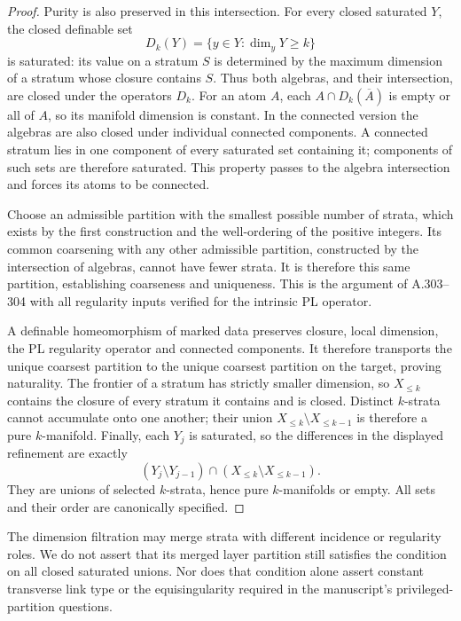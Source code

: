 \begin{proof}
Purity is also preserved in this intersection. For every closed
saturated $Y$, the closed definable set
\[
 D_k(Y)=\{y\in Y:\dim_yY\ge k\}
\]
is saturated: its value on a stratum $S$ is determined by the
maximum dimension of a stratum whose closure contains $S$.
Thus both algebras, and their intersection, are closed under the
operators $D_k$. For an atom $A$, each $A\cap D_k(\overline A)$
is empty or all of $A$, so its manifold dimension is constant.
In the connected version the algebras are also closed under
individual connected components. A connected stratum lies in one
component of every saturated set containing it; components of such
sets are therefore saturated. This property passes to the algebra
intersection and forces its atoms to be connected.

Choose an admissible partition with the smallest possible number
of strata, which exists by the first construction and the
well-ordering of the positive integers. Its common coarsening with
any other admissible partition, constructed by the intersection
of algebras, cannot have fewer strata. It is therefore this same
partition, establishing coarseness and uniqueness. This is the
argument of A.303--304 with all regularity inputs verified for
the intrinsic PL operator.

A definable homeomorphism of marked data preserves closure, local
dimension, the PL regularity operator and connected components.
It therefore transports the unique coarsest partition to the
unique coarsest partition on the target, proving naturality.
The frontier of a stratum has strictly smaller dimension, so
$X_{\le k}$ contains the closure of every stratum it contains
and is closed. Distinct $k$-strata cannot accumulate onto one
another; their union $X_{\le k}\setminus X_{\le k-1}$ is therefore
a pure $k$-manifold. Finally, each $Y_j$ is saturated, so the
differences in the displayed refinement are exactly
\[
 (Y_j\setminus Y_{j-1})\cap
 (X_{\le k}\setminus X_{\le k-1}).
\]
They are unions of selected $k$-strata, hence pure $k$-manifolds
or empty. All sets and their order are canonically specified.
\end{proof}

The dimension filtration may merge strata with different incidence
or regularity roles. We do not assert that its merged layer
partition still satisfies the condition on all closed saturated
unions. Nor does that condition alone assert constant transverse
link type or the equisingularity required in the manuscript's
privileged-partition questions.

